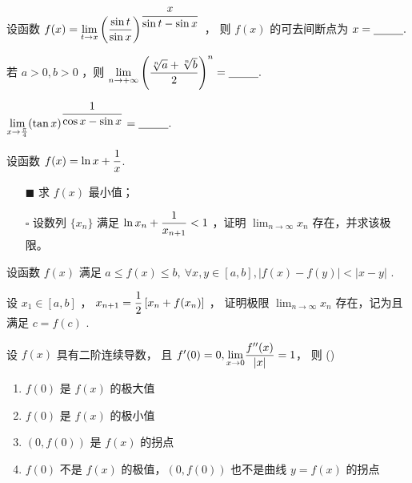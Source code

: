 \begin{Quest}[C1T12\goto{T3}]
    设函数 $\displaystyle f(x) = {\displaystyle\lim_{t\rightarrow x}}
    \left(\frac{\sin t}{\sin x}\right)^{\displaystyle \frac{x}{\sin t-\sin x}} $ ，
    则 $ f(x) $ 的可去间断点为 $ x=\underline{~~~~~~~~}. $ 
\end{Quest}

\begin{Quest}[C1T15\goto{T4}]
    若 $ a>0,b>0 $ ，则 $ \displaystyle {\displaystyle\lim_{n\rightarrow +\infty}}
    \left(\frac{\sqrt[n]a+\sqrt[n]b}{2}\right)^n = \underline{~~~~~~~~}. $ 
\end{Quest}

\begin{Quest}[C1T16\goto{T5}]
    $ \displaystyle {\displaystyle\lim_{x\rightarrow \frac{\pi}{4}}}(\tan x)^{\displaystyle\frac{1}{\cos x-\sin x}} = \underline{~~~~~~~~}. $ 
\end{Quest}

\begin{Quest}[C1T20\goto{T6}]
    设函数 $\displaystyle f(x)=\ln x + \frac{1}{x} $.
    \begin{itemize}
        \item[$ \blacksquare $ ] 求 $ f(x) $ 最小值；
        \item[$ \square $ ] 设数列 $ \{x_n\} $ 满足 $ \displaystyle \ln x_n + \frac{1}{x_{n+1}}<1 $ ，证明
        $ {\displaystyle\lim_{n\rightarrow \infty}}x_n $ 存在，并求该极限。
    \end{itemize}
\end{Quest}

\begin{Quest}[C1T22\goto{T7}]
    设函数 $ f(x) $ 满足 $a \leq f(x)\leq b,\ \forall x,y\in [a,b],|f(x)-f(y)|<|x-y|  $ .

    设 $ x_1\in[a,b] $ ， $\displaystyle x_{n+1}=\frac{1}{2}\left[x_n+f(x_n)\right] $ ，
    证明极限 $ {\displaystyle\lim_{n\rightarrow \infty}}x_n $ 存在，记为且满足
    $ c=f(c) $ .
\end{Quest}

\begin{quest}[C2T1]
    设 $ f(x) $ 具有二阶连续导数，
    且 $ f'(0) = 0,{\displaystyle\lim_{x\rightarrow 0}}\dfrac{f^{\prime\prime}(x)}{|x|} = 1 $，
    则 ()
    \begin{enumerate}
        \item $ f(0) $ 是 $ f(x) $ 的极大值
        \item $ f(0) $ 是 $ f(x) $ 的极小值
        \item $ (0,f(0)) $ 是 $ f(x) $ 的拐点
        \item $ f(0) $ 不是 $ f(x) $ 的极值，$ (0,f(0)) $ 也不是曲线 $ y=f(x) $ 的拐点
    \end{enumerate} 
\end{quest}


